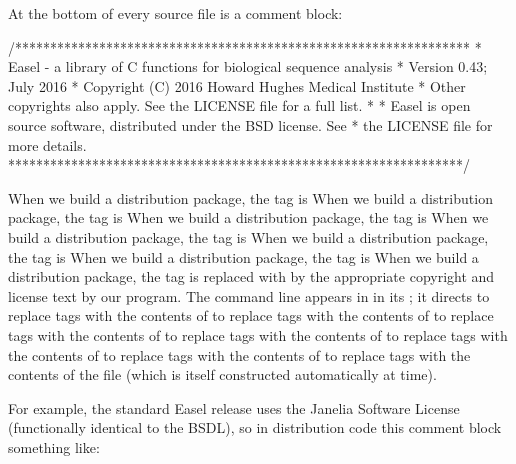At the bottom of every source file is a comment block:

\begin{cchunk}
/*****************************************************************
 * Easel - a library of C functions for biological sequence analysis
 * Version 0.43; July 2016
 * Copyright (C) 2016 Howard Hughes Medical Institute
 * Other copyrights also apply. See the LICENSE file for a full list.
 * 
 * Easel is open source software, distributed under the BSD license. See
 * the LICENSE file for more details.
 *****************************************************************/
\end{cchunk}

When we build a distribution package, the  tag is
When we build a distribution package, the  tag is
When we build a distribution package, the  tag is
When we build a distribution package, the  tag is
When we build a distribution package, the \ccode{} tag is
When we build a distribution package, the  tag is
When we build a distribution package, the  tag is
replaced with by the appropriate copyright and license text by our
 program. The command line appears in
 in its ; it directs
 to replace  tags with the contents of
 to replace  tags with the contents of
 to replace  tags with the contents of
 to replace  tags with the contents of
 to replace \ccode{} tags with the contents of
 to replace  tags with the contents of
 to replace  tags with the contents of
the  file (which is itself constructed
automatically at  time).

For example, the standard Easel release uses the Janelia Software
License (functionally identical to the BSDL), so in distribution code
this comment block something like:

